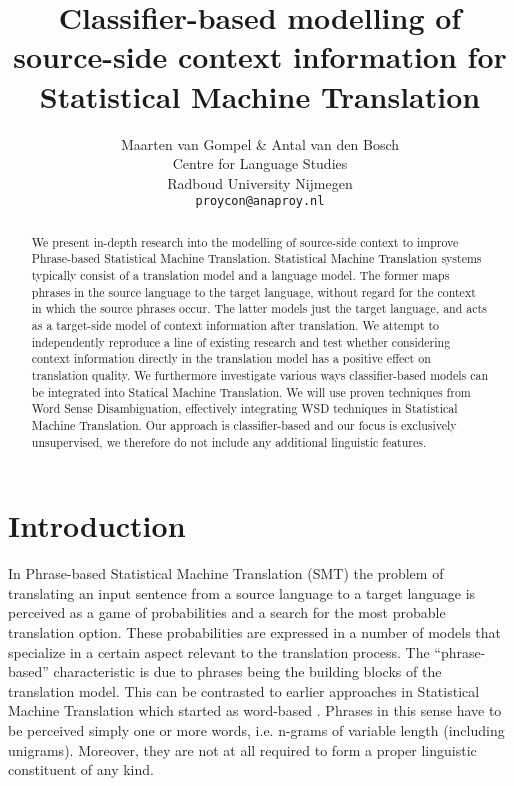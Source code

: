 \documentclass[11pt]{article}
\title{Classifier-based modelling of source-side context information for Statistical Machine Translation}
\author{Maarten van Gompel \& Antal van den Bosch \\
 Centre for Language Studies \\
  Radboud University Nijmegen \\
  {\tt proycon@anaproy.nl}}
\begin{document}
\maketitle

\begin{abstract} 
We present in-depth research into the modelling of source-side
context to improve Phrase-based Statistical Machine Translation. Statistical
Machine Translation systems typically consist of a translation model and a
language model. The former maps phrases in the source language to the target
language, without regard for the context in which the source phrases occur. The
latter models just the target language, and acts as a target-side model of
context information after translation. We attempt to independently reproduce a
line of existing research and test whether considering context information
directly in the translation model has a positive effect on translation quality.
We furthermore investigate various ways classifier-based models can be
integrated into Statical Machine Translation.  We will use proven techniques
from Word Sense Disambiguation, effectively integrating WSD techniques in
Statistical Machine Translation. Our approach is classifier-based and our focus
is exclusively unsupervised, we therefore do not include any additional linguistic
features. 
\end{abstract}

\section{Introduction}

In Phrase-based Statistical Machine Translation (SMT) the problem of
translating an input sentence from a source language to a target language is
perceived as a game of probabilities and a search for the most probable
translation option.  These probabilities are expressed in a number of models
that specialize in a certain aspect relevant to the translation process. The
``phrase-based'' characteristic is due to phrases being the building blocks of
the translation model. This can be contrasted to earlier approaches in
Statistical Machine Translation which started as word-based \cite{OCHNEY?}.
Phrases in this sense have to be perceived simply one or more words, i.e.
n-grams of variable length (including unigrams). Moreover, they are not at all
required to form a proper linguistic constituent of any kind.
\end{document}
